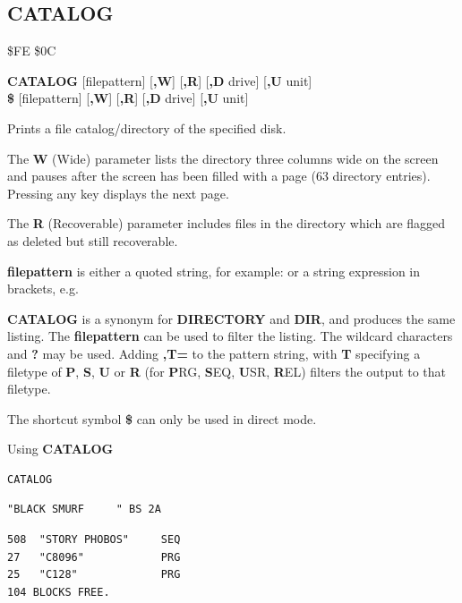 \subsection{CATALOG}
\begin{description}[leftmargin=2cm,style=nextline]
\item [Token:]  \$FE \$0C
\item [Format:] {\bf CATALOG} [filepattern] [{\bf,W}] [{\bf,R}]
		[{\bf,D} drive] [{\bf,U} unit] \\
		{\bf\$} [filepattern] [{\bf,W}] [{\bf,R}]
		[{\bf,D} drive] [{\bf,U} unit]
\item [Usage:]  Prints a file catalog/directory of the specified disk.

   The {\bf W} (Wide) parameter lists the directory three columns wide
   on the screen and pauses after the screen has been filled with a page
   (63 directory entries). Pressing any key displays the next page.

   The {\bf R} (Recoverable) parameter includes files in the
   directory which are flagged as deleted but still
   recoverable.

   {\bf filepattern} is either a quoted string, for example:  or
   a string expression in brackets, e.g. 

   \drivedefinition

   \unitdefinition

\item [Remarks:]
   {\bf CATALOG} is a synonym for {\bf DIRECTORY}
   and {\bf DIR}, and produces the same listing.
   The {\bf filepattern} can be used to filter the listing.
   The wildcard characters {\bf *} and {\bf ?} may be used.
   Adding {\bf ,T=} to the pattern string, with {\bf T} specifying
   a filetype of {\bf P}, {\bf S}, {\bf U} or {\bf R}
   (for {\bf P}RG, {\bf S}EQ, {\bf U}SR, {\bf R}EL) filters the
   output to that filetype.

   The shortcut symbol {\bf \$} can only be used in direct mode.

\item [Examples:] Using {\bf CATALOG}

\begin{tcolorbox}[colback=black,coltext=white]
\verbatimfont{\codefont}
\begin{verbatim}
CATALOG
\end{verbatim}
\selectfont{\codefont 0}
\begin{tcolorbox}[colback=white,coltext=black,arc=0mm,boxrule=0mm,
       left*=0.5mm,right*=0mm,top=0mm,bottom=0mm,nobeforeafter,
       left skip=0.5mm,
       width=28mm,height=3mm,valign=center]
\begin{verbatim}
"BLACK SMURF     " BS 2A
\end{verbatim}
\end{tcolorbox}
\begin{verbatim}
508  "STORY PHOBOS"     SEQ
27   "C8096"            PRG
25   "C128"             PRG
104 BLOCKS FREE.
\end{verbatim}
\end{tcolorbox}


\end{description}
